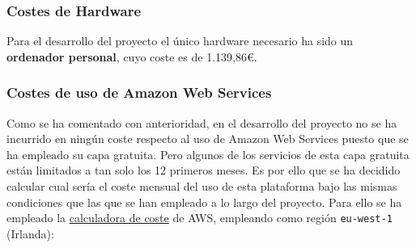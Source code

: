 \subsubsection{Costes de Hardware}

Para el desarrollo del proyecto el único hardware necesario ha sido un \textbf{ordenador personal}, cuyo coste es de 1.139,86€.

\subsubsection{Costes de uso de Amazon Web Services}

Como se ha comentado con anterioridad, en el desarrollo del proyecto no se ha incurrido en ningún coste respecto al uso de Amazon Web Services puesto que se ha empleado su capa gratuita. Pero algunos de los servicios de esta capa gratuita están limitados a tan solo los 12 primeros meses. Es por ello que se ha decidido calcular cual sería el coste mensual del uso de esta plataforma bajo las mismas condiciones que las que se han empleado a lo largo del proyecto. Para ello se ha empleado la \href{https://calculator.aws/#/}{calculadora de coste} de AWS, empleando como región \texttt{eu-west-1} (Irlanda):

